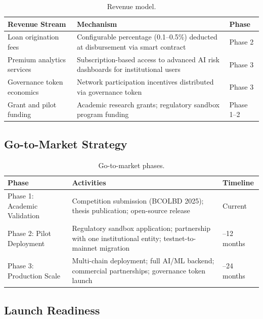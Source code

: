 \documentclass[11pt,a4paper]{article}
\newcommand{\tableheadfont}{\bfseries\small\color{PrimaryBlue}}
\newenvironment{moderntable}[1][H]{%
    \begin{table}[#1]\centering\small%
    \renewcommand{\arraystretch}{1.35}%
}{%
    \end{table}%
}
\begin{document}
\begin{moderntable}
\caption{Revenue model.}
\begin{tabular}{@{} >{\raggedright}p{3.5cm} >{\raggedright}p{5.5cm} >{\raggedright\arraybackslash}p{2cm} @{}}
\toprule
\tableheadfont Revenue Stream & \tableheadfont Mechanism & \tableheadfont Phase \\
\midrule
\rowcolor{RowShade}
Loan origination fees & Configurable percentage (0.1--0.5\%) deducted at disbursement via smart contract & Phase 2 \\
Premium analytics services & Subscription-based access to advanced AI risk dashboards for institutional users & Phase 3 \\
\rowcolor{RowShade}
Governance token economics & Network participation incentives distributed via governance token & Phase 3 \\
Grant and pilot funding & Academic research grants; regulatory sandbox program funding & Phase 1--2 \\
\bottomrule
\end{tabular}
\end{moderntable}

\subsection{Go-to-Market Strategy}

\begin{moderntable}
\caption{Go-to-market phases.}
\begin{tabular}{@{} >{\raggedright}p{3cm} >{\raggedright}p{6.5cm} >{\raggedright\arraybackslash}p{2.5cm} @{}}
\toprule
\tableheadfont Phase & \tableheadfont Activities & \tableheadfont Timeline \\
\midrule
\rowcolor{RowShade}
Phase 1: Academic Validation & Competition submission (BCOLBD 2025); thesis publication; open-source release & Current \\
Phase 2: Pilot Deployment & Regulatory sandbox application; partnership with one institutional entity; testnet-to-mainnet migration & 6--12 months \\
\rowcolor{RowShade}
Phase 3: Production Scale & Multi-chain deployment; full AI/ML backend; commercial partnerships; governance token launch & 12--24 months \\
\bottomrule
\end{tabular}
\end{moderntable}

\subsection{Launch Readiness}
\end{document}
